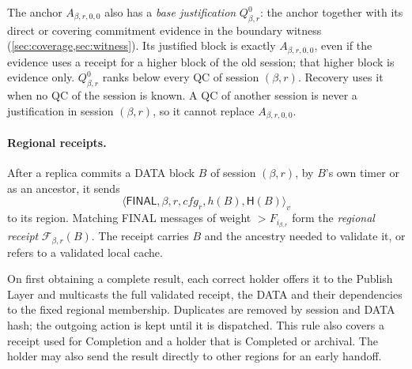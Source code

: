 \documentclass[11pt,a4paper]{article}
\newcommand{\FC}{\mathcal F}
\newcommand{\Hash}{\mathsf H}
\newcommand{\tagg}[1]{\ensuremath{\mathsf{#1}}}
\newcommand{\defterm}[1]{\textcolor{rrBlue}{\textit{#1}}}
\begin{document}
The anchor $A_{\beta,r,0,0}$ also has a \defterm{base justification}
$Q_{\beta,r}^0$: the anchor together with its direct or covering
commitment evidence in the boundary witness
(\cref{sec:coverage,sec:witness}). Its justified block is exactly
$A_{\beta,r,0,0}$, even if the evidence uses a receipt for a higher
block of the old session; that higher block is evidence only.
$Q_{\beta,r}^0$ ranks below every QC of session $(\beta,r)$. Recovery
uses it when no QC of the session is known. A QC of another session is
never a justification in session $(\beta,r)$, so it cannot replace
$A_{\beta,r,0,0}$.

\paragraph{Regional receipts.}
After a replica commits a DATA block $B$ of session $(\beta,r)$, by $B$'s
own timer or as an ancestor, it sends
\[
 \langle\tagg{FINAL},\beta,r,\mathit{cfg}_r,h(B),\Hash(B)\rangle_v
\]
to its region. Matching FINAL messages of weight $>F_{i_{\beta,r}}$ form
the \defterm{regional receipt} $\FC_{\beta,r}(B)$. The receipt carries
$B$ and the ancestry needed to validate it, or refers to a validated
local cache.

On first obtaining a complete result, each correct holder offers it to
the Publish Layer and multicasts the full validated receipt, the DATA
and their dependencies to the fixed regional membership. Duplicates are
removed by session and DATA hash; the outgoing action is kept until it
is dispatched. This rule also covers a receipt used for Completion and
a holder that is Completed or archival. The holder may also send the
result directly to other regions for an early handoff.
\end{document}
